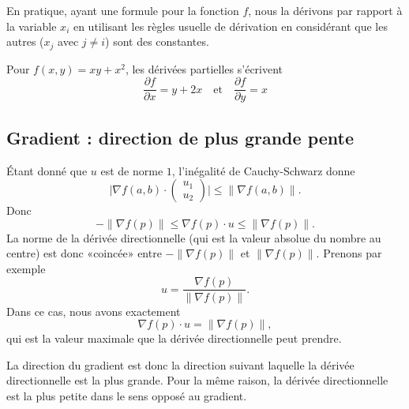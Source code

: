 \begin{normaltext} \label{deriveepartielles}
	En pratique, ayant une formule pour la fonction \( f\), nous la dérivons par rapport à la variable \( x_i\) en utilisant les règles usuelle de dérivation en considérant que les autres (\( x_j\) avec \( j \neq i\)) sont des constantes.
\end{normaltext}

\begin{example}
    Pour \( f(x,y) = xy + x^2\), les dérivées partielles
	s'écrivent
	\begin{equation*}
		\frac{\partial f}{\partial x} = y + 2x \quad\text{et}\quad \frac{\partial f}{\partial y} = x
	\end{equation*}
\end{example}

\subsection{Gradient : direction de plus grande pente}

Étant donné que \( u\) est de norme \( 1\), l'inégalité de Cauchy-Schwarz donne
\begin{equation}
	\big| \nabla f(a,b)\cdot \begin{pmatrix}
		u_1 \\
		u_2
	\end{pmatrix}\big|\leq \| \nabla f(a,b) \|.
\end{equation}
Donc
\begin{equation}
	-\| \nabla f(p) \|\leq \nabla f(p)\cdot u\leq\| \nabla f(p) \|.
\end{equation}
La norme de la dérivée directionnelle (qui est la valeur absolue du nombre au centre) est donc «coincée» entre \( -\| \nabla f(p) \|\) et \( \| \nabla f(p) \|\). Prenons par exemple
\begin{equation}
	u=\frac{ \nabla f(p) }{ \| \nabla f(p) \| }.
\end{equation}
Dans ce cas, nous avons exactement
\begin{equation}
	\nabla f(p)\cdot u=\| \nabla f(p) \|,
\end{equation}
qui est la valeur maximale que la dérivée directionnelle peut prendre.

La direction du gradient est donc la direction suivant laquelle la dérivée directionnelle est la plus grande. Pour la même raison, la dérivée directionnelle est la plus petite dans le sens opposé au gradient.

